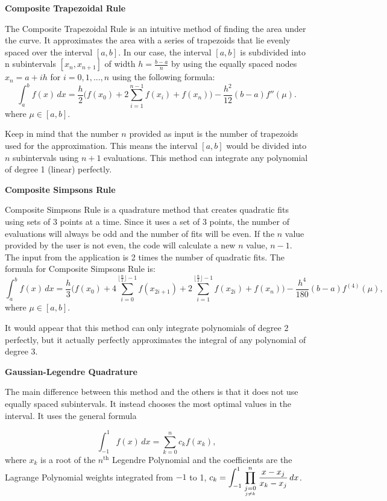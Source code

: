 \documentclass[12pt]{article}
\newcommand{\newLine}{\vspace{5mm}}
\newcommand{\integral}[3]{\text{$\int^{#2}_{#1} #3\,dx$}}
\newcommand{\summation}[3]{\text{$\sum^{#2}_{#1} #3$}}
\newcommand{\floor}[1]{\text{$\lfloor#1\rfloor$}}
\begin{document}
\newLine\noindent  \textbf{Composite Trapezoidal Rule}

The Composite Trapezoidal Rule is an intuitive method of finding the area under the curve. It approximates the area with a series of trapezoids that lie evenly spaced over the interval $[a,b]$.
In our case, the interval $[a,b]$ is subdivided into n subintervals $[x_n, x_{n+1}]$ of width $h = \frac{b-a}{n}$ by using the equally spaced nodes $x_n = a + ih$ for $i = 0,1,...,n$ using the following formula:
\begin{equation*} 
\integral{a}{b}{f(x)} = \frac{h}{2}\Big(f(x_0) + 2\summation{i = 1}{n-1}{f(x_i)} + f(x_n)\Big) - \frac{h^2}{12}(b-a)f''(\mu).
\end{equation*}
where $\mu\in[a,b]$.

Keep in mind that the number $n$ provided as input is the number of trapezoids used for the approximation. This means the interval $[a,b]$ would be divided into $n$ subintervals using $n+1$ evaluations. This method can integrate any polynomial of degree 1 (linear) perfectly.

\newLine\noindent\textbf{Composite Simpsons Rule}

Composite Simpsons Rule is a quadrature method that creates quadratic fits using sets of 3 points at a time. Since it uses a set of 3 points, the number of evaluations will always be odd and the number of fits will be even. If the $n$ value provided by the user is not even, the code will calculate a new $n$ value, $n-1$. The input from the application is 2 times the number of quadratic fits. The formula for Composite Simpsons Rule is:
\begin{equation*}  \integral{a}{b}{f(x)} = \frac{h}{3}\Big(f(x_0) + 4\summation{i=0}{\floor{\frac{n}{2}}-1}{f(x_{2i+1})} + 2\summation{i=1}{\floor{\frac{n}{2}}-1}{f(x_{2i})} + f(x_n)\Big) - \frac{h^4}{180}(b-a)f^{(4)}(\mu),
\end{equation*}
where $\mu\in[a,b]$.

It would appear that this method can only integrate polynomials of degree 2 perfectly, but it actually perfectly approximates the integral of any polynomial of degree 3.

\newLine\noindent\textbf{Gaussian-Legendre Quadrature}

The main difference between this method and the others is that it does not use equally spaced subintervals. It instead chooses the most optimal values in the interval. It uses the general formula

\begin{equation*} \integral{-1}{1}{f(x)} = \summation{k=0}{n}{c_kf(x_k)},
\end{equation*}
where $x_k$ is a root of the $n^{\text{th}}$ Legendre Polynomial and the coefficients are the Lagrange Polynomial weights integrated from $-1$ to 1, $c_k=\displaystyle\integral{-1}{1}{\prod_{\scriptstyle j=0\atop j\neq k}^n\frac{x-x_j}{x_k-x_j}}$.
\end{document}
